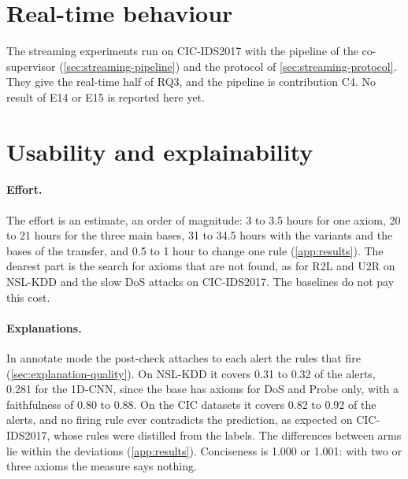 \section{Real-time behaviour}
\label{sec:res-realtime}

The streaming experiments run on CIC-IDS2017 with the pipeline of the co-supervisor (\cref{sec:streaming-pipeline})
and the protocol of \cref{sec:streaming-protocol}. They give the real-time half of RQ3, and the pipeline is contribution
C4. No result of E14 or E15 is reported here yet.

\section{Usability and explainability}
\label{sec:res-usability}

\paragraph{Effort.}
The effort is an estimate, an order of magnitude: 3 to 3.5 hours for one axiom, 20 to 21 hours for the three main bases,
31 to 34.5 hours with the variants and the bases of the transfer, and 0.5 to 1 hour to change one rule
(\cref{app:results}). The dearest part is the search for axioms that are not found, as for R2L and U2R on NSL-KDD and
the slow DoS attacks on CIC-IDS2017. The baselines do not pay this cost.

\paragraph{Explanations.}
In annotate mode the post-check attaches to each alert the rules that fire (\cref{sec:explanation-quality}). On NSL-KDD
it covers 0.31 to 0.32 of the alerts, 0.281 for the 1D-CNN, since the base has axioms for DoS and Probe only, with a
faithfulness of 0.80 to 0.88. On the CIC datasets it covers 0.82 to 0.92 of the alerts, and no firing rule ever
contradicts the prediction, as expected on CIC-IDS2017, whose rules were distilled from the labels. The differences
between arms lie within the deviations (\cref{app:results}). Conciseness is 1.000 or 1.001: with two or three axioms
the measure says nothing.

